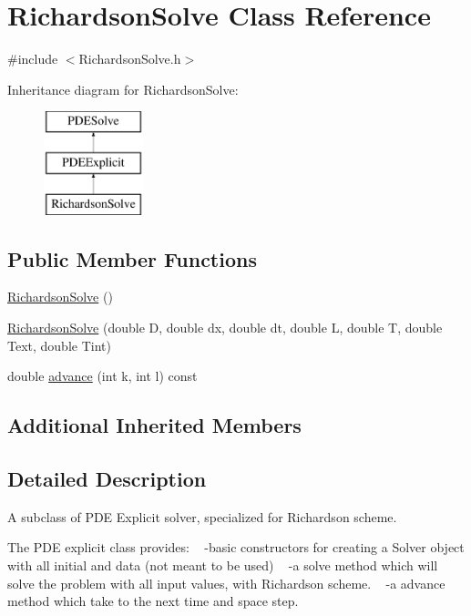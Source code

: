 \hypertarget{class_richardson_solve}{}\section{Richardson\+Solve Class Reference}
\label{class_richardson_solve}


{\ttfamily \#include $<$Richardson\+Solve.\+h$>$}

Inheritance diagram for Richardson\+Solve\+:\begin{figure}[H]
\begin{center}
\leavevmode
\includegraphics[height=3.000000cm]{class_richardson_solve}
\end{center}
\end{figure}
\subsection*{Public Member Functions}
\begin{DoxyCompactItemize}
\item 
\hyperlink{class_richardson_solve_a628a7f9104201f63094a49cb9d23b5ca}{Richardson\+Solve} ()
\item 
\hyperlink{class_richardson_solve_a181c71a169292bdba433af2564f763b5}{Richardson\+Solve} (double D, double dx, double dt, double L, double T, double Text, double Tint)
\item 
double \hyperlink{class_richardson_solve_adaedf7448ffb94b08690ce6e878ab33c}{advance} (int k, int l) const
\end{DoxyCompactItemize}
\subsection*{Additional Inherited Members}


\subsection{Detailed Description}
A subclass of P\+DE Explicit solver, specialized for Richardson scheme.

The P\+DE explicit class provides\+: ~\newline
-\/basic constructors for creating a Solver object with all initial  and data (not meant to be used) ~\newline
-\/a solve method which will solve the problem with all input values,  with Richardson scheme. ~\newline
-\/a advance method which take to the next time and space step. 

